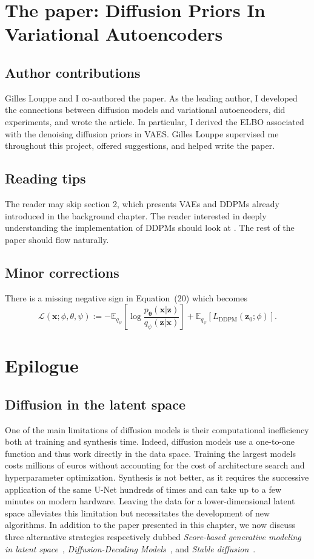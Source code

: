 \section{The paper: Diffusion Priors In Variational Autoencoders}

\subsection{Author contributions}
Gilles Louppe and I co-authored the paper. As the leading author, I developed the connections between diffusion models and variational autoencoders, did experiments, and wrote the article. In particular, I derived the ELBO associated with the denoising diffusion priors in VAES. Gilles Louppe supervised me throughout this project, offered suggestions, and helped write the paper.

\subsection{Reading tips}
The reader may skip section 2, which presents VAEs and DDPMs already introduced in the background chapter. The reader interested in deeply understanding the implementation of DDPMs should look at \citet{ho_denoising_2020}. The rest of the paper should flow naturally.

\subsection{Minor corrections}
There is a missing negative sign in Equation~(20) which becomes
$$\mathcal{L}(\mathbf{x}; \phi, \theta, \psi) := -\mathbb{E}_{q_{\psi}}\left[\log \frac{p_{\mathbf{\theta}}(\mathbf{x}|\mathbf{z})}{q_{\psi}(\mathbf{z}|\mathbf{x})} \right] + \mathbb{E}_{q_{\psi}}\left[ L_{\text{DDPM}}(\mathbf{z}_0; \phi)\right].$$



\section{Epilogue}
\subsection{Diffusion in the latent space}
One of the main limitations of diffusion models is their computational inefficiency both at training and synthesis time. Indeed, diffusion models use a one-to-one function and thus work directly in the data space. Training the largest models costs millions of euros without accounting for the cost of architecture search and hyperparameter optimization. Synthesis is not better, as it requires the successive application of the same U-Net hundreds of times and can take up to a few minutes on modern hardware. Leaving the data for a lower-dimensional latent space alleviates this limitation but necessitates the development of new algorithms. In addition to the paper presented in this chapter, we now discuss three alternative strategies respectively dubbed \textit{Score-based generative modeling in latent space}~\citep{vahdat2021score}, \textit{Diffusion-Decoding Models}~\citep{sinha2021d2c}, and \textit{Stable diffusion}~\citep{rombach2022high}.

